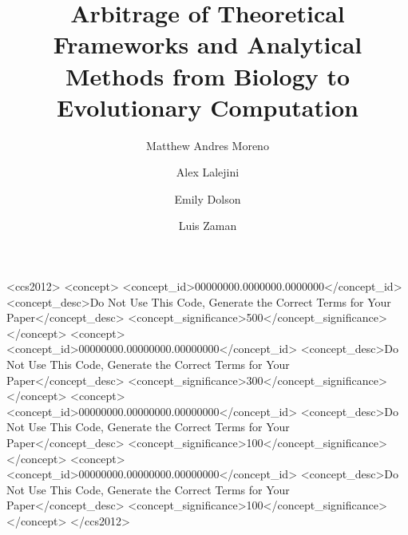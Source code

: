 

\title{Arbitrage of Theoretical Frameworks and Analytical Methods from Biology to Evolutionary Computation}

\author{Matthew Andres Moreno}

\author{Alex Lalejini}

\author{Emily Dolson}

\author{Luis Zaman}

\renewcommand{\shortauthors}{Moreno et al.}



\begin{CCSXML}
<ccs2012>
 <concept>
  <concept_id>00000000.0000000.0000000</concept_id>
  <concept_desc>Do Not Use This Code, Generate the Correct Terms for Your Paper</concept_desc>
  <concept_significance>500</concept_significance>
 </concept>
 <concept>
  <concept_id>00000000.00000000.00000000</concept_id>
  <concept_desc>Do Not Use This Code, Generate the Correct Terms for Your Paper</concept_desc>
  <concept_significance>300</concept_significance>
 </concept>
 <concept>
  <concept_id>00000000.00000000.00000000</concept_id>
  <concept_desc>Do Not Use This Code, Generate the Correct Terms for Your Paper</concept_desc>
  <concept_significance>100</concept_significance>
 </concept>
 <concept>
  <concept_id>00000000.00000000.00000000</concept_id>
  <concept_desc>Do Not Use This Code, Generate the Correct Terms for Your Paper</concept_desc>
  <concept_significance>100</concept_significance>
 </concept>
</ccs2012>
\end{CCSXML}

